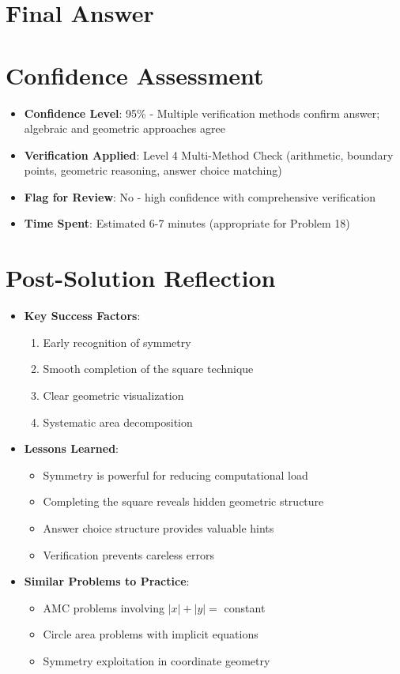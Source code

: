 \documentclass[]{article}
\begin{document}
\section*{Final Answer}

\section*{Confidence Assessment}
\begin{itemize}[leftmargin=*]
    \item \textbf{Confidence Level}: 95\% - Multiple verification methods confirm answer; algebraic and geometric approaches agree
    \item \textbf{Verification Applied}: Level 4 Multi-Method Check (arithmetic, boundary points, geometric reasoning, answer choice matching)
    \item \textbf{Flag for Review}: No - high confidence with comprehensive verification
    \item \textbf{Time Spent}: Estimated 6-7 minutes (appropriate for Problem 18)
\end{itemize}

\section*{Post-Solution Reflection}
\begin{itemize}[leftmargin=*]
    \item \textbf{Key Success Factors}:
    \begin{enumerate}
        \item Early recognition of symmetry
        \item Smooth completion of the square technique
        \item Clear geometric visualization
        \item Systematic area decomposition
    \end{enumerate}
    
    \item \textbf{Lessons Learned}:
    \begin{itemize}
        \item Symmetry is powerful for reducing computational load
        \item Completing the square reveals hidden geometric structure
        \item Answer choice structure provides valuable hints
        \item Verification prevents careless errors
    \end{itemize}
    
    \item \textbf{Similar Problems to Practice}:
    \begin{itemize}
        \item AMC problems involving $|x| + |y| = $ constant
        \item Circle area problems with implicit equations
        \item Symmetry exploitation in coordinate geometry
    \end{itemize}
\end{itemize}
\end{document}
